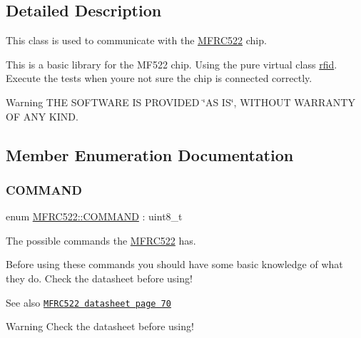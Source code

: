 \subsection{Detailed Description}
This class is used to communicate with the \mbox{\hyperlink{class_m_f_r_c522}{M\+F\+R\+C522}} chip. 

This is a basic library for the M\+F522 chip. Using the pure virtual class \mbox{\hyperlink{classrfid}{rfid}}. Execute the tests when you\textquotesingle{}re not sure the chip is connected correctly. \begin{DoxyWarning}{Warning}
T\+HE S\+O\+F\+T\+W\+A\+RE IS P\+R\+O\+V\+I\+D\+ED \char`\"{}\+A\+S I\+S\char`\"{}, W\+I\+T\+H\+O\+UT W\+A\+R\+R\+A\+N\+TY OF A\+NY K\+I\+ND. 
\end{DoxyWarning}


\subsection{Member Enumeration Documentation}
\mbox{\label{class_m_f_r_c522_abf038692c9cf33ed59b44a612e6ed1c7}} 
\subsubsection{\texorpdfstring{C\+O\+M\+M\+A\+ND}{COMMAND}}
{\footnotesize\ttfamily enum \mbox{\hyperlink{class_m_f_r_c522_abf038692c9cf33ed59b44a612e6ed1c7}{M\+F\+R\+C522\+::\+C\+O\+M\+M\+A\+ND}} \+: uint8\+\_\+t}



The possible commands the \mbox{\hyperlink{class_m_f_r_c522}{M\+F\+R\+C522}} has. 

Before using these commands you should have some basic knowledge of what they do. Check the datasheet before using! \begin{DoxySeeAlso}{See also}
\href{https://www.nxp.com/docs/en/data-sheet/MFRC522.pdf}{\tt M\+F\+R\+C522 datasheet page 70} 
\end{DoxySeeAlso}
\begin{DoxyWarning}{Warning}
Check the datasheet before using! 
\end{DoxyWarning}
\mbox{\label{class_m_f_r_c522_a1160642f3b2b60b5ea7309374a8d760a}} 

